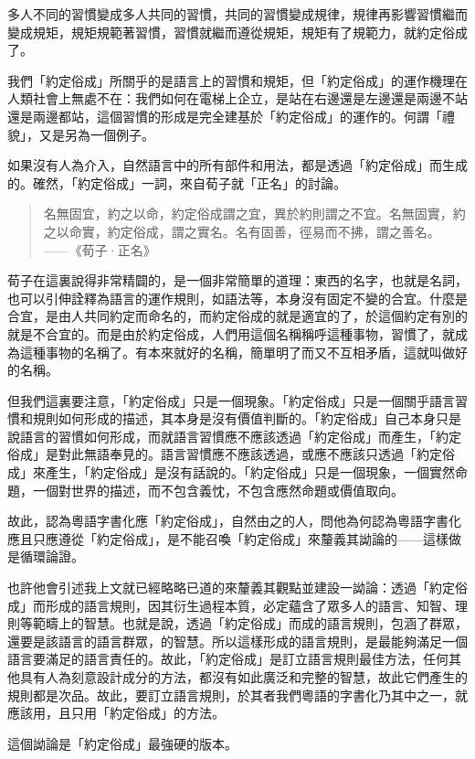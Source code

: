 \documentclass[a5paper, 10pt, openany]{book} %
\begin{document}
多人不同的習慣變成多人共同的習慣，共同的習慣變成規律，規律再影響習慣繼而變成規矩，規矩規範著習慣，習慣就繼而遵從規矩，規矩有了規範力，就約定俗成了。

我們「約定俗成」所關乎的是語言上的習慣和規矩，但「約定俗成」的運作機理在人類社會上無處不在：我們如何在電梯上企立，是站在右邊還是左邊還是兩邊不站還是兩邊都站，這個習慣的形成是完全建基於「約定俗成」的運作的。何謂「禮貌」，又是另為一個例子。

如果沒有人為介入，自然語言中的所有部件和用法，都是透過「約定俗成」而生成的。確然，「約定俗成」一詞，來自荀子就「正名」的討論。

\begin{quotation}
  名無固宜，約之以命，約定俗成謂之宜，異於約則謂之不宜。名無固實，約之以命實，約定俗成，謂之實名。名有固善，徑易而不拂，謂之善名。
——《荀子·正名》
\end{quotation}

荀子在這裏說得非常精闢的，是一個非常簡單的道理：東西的名字，也就是名詞，也可以引伸詮釋為語言的運作規則，如語法等，本身沒有固定不變的合宜。什麼是合宜，是由人共同約定而命名的，而約定俗成的就是適宜的了，於這個約定有別的就是不合宜的。而是由於約定俗成，人們用這個名稱稱呼這種事物，習慣了，就成為這種事物的名稱了。有本來就好的名稱，簡單明了而又不互相矛盾，這就叫做好的名稱。

但我們這裏要注意，「約定俗成」只是一個現象。「約定俗成」只是一個關乎語言習慣和規則如何形成的描述，其本身是沒有價值判斷的。「約定俗成」自己本身只是說語言的習慣如何形成，而就語言習慣應不應該透過「約定俗成」而產生，「約定俗成」是對此無語奉見的。語言習慣應不應該透過，或應不應該只透過「約定俗成」來產生，「約定俗成」是沒有話說的。「約定俗成」只是一個現象，一個實然命題，一個對世界的描述，而不包含義忱，不包含應然命題或價值取向。

故此，認為粵語字書化應「約定俗成」，自然由之的人，問他為何認為粵語字書化應且只應遵從「約定俗成」，是不能召喚「約定俗成」來釐義其詏論的——這樣做是循環論證。

也許他會引述我上文就已經略略已道的來釐義其觀點並建設一詏論：透過「約定俗成」而形成的語言規則，因其衍生過程本質，必定蘊含了眾多人的語言、知智、理則等範疇上的智慧。也就是說，透過「約定俗成」而成的語言規則，包涵了群眾，還要是該語言的語言群眾，的智慧。所以這樣形成的語言規則，是最能夠滿足一個語言要滿足的語言責任的。故此，「約定俗成」是訂立語言規則最佳方法，任何其他具有人為刻意設計成分的方法，都沒有如此廣泛和完整的智慧，故此它們產生的規則都是次品。故此，要訂立語言規則，於其者我們粵語的字書化乃其中之一，就應該用，且只用「約定俗成」的方法。

這個詏論是「約定俗成」最強硬的版本。
\end{document}
